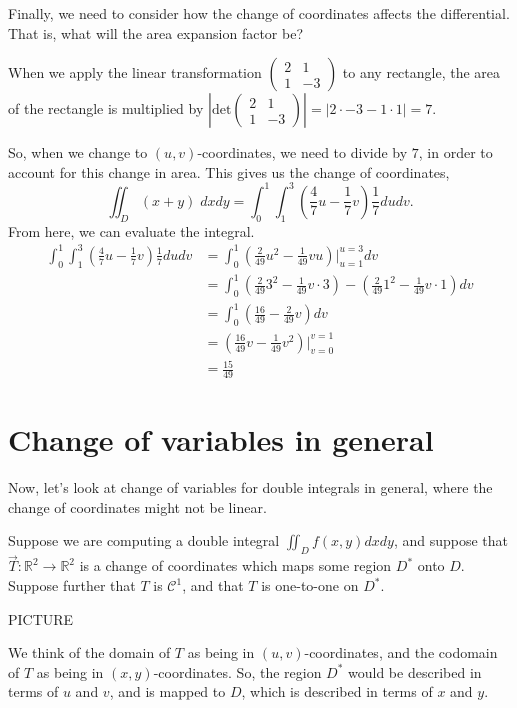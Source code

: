 \documentclass{ximera}
\begin{document}
Finally, we need to consider how the change of coordinates affects the differential. That is, what will the area expansion factor be?

When we apply the linear transformation $\begin{pmatrix}
2 & 1\\
1 & -3
\end{pmatrix}$ to any rectangle, the area of the rectangle is multiplied by $\left|\text{det}\begin{pmatrix}
2 & 1\\
1 & -3
\end{pmatrix}\right| = \left|2\cdot -3 - 1\cdot 1\right| = 7$.

So, when we change to $(u,v)$-coordinates, we need to divide by $7$, in order to account for this change in area. This gives us the change of coordinates,
\[
\iint_D (x+y)\;dxdy =\int_0^1\int_1^3 \left(\frac{4}{7}u - \frac{1}{7}v\right)\frac{1}{7}dudv.
\]
From here, we can evaluate the integral.
\begin{align*}
\int_0^1\int_1^3 \left(\frac{4}{7}u - \frac{1}{7}v\right)\frac{1}{7}dudv
&= \int_0^1 \left(\frac{2}{49}u^2 - \frac{1}{49}vu\right)|_{u=1}^{u=3}dv\\
&= \int_0^1 \left(\frac{2}{49}3^2 - \frac{1}{49}v\cdot 3\right) - \left(\frac{2}{49}1^2 - \frac{1}{49}v\cdot 1\right)dv\\
&= \int_0^1 \left(\frac{16}{49} - \frac{2}{49}v\right)dv\\
&= \left(\frac{16}{49}v - \frac{1}{49}v^2\right)|_{v=0}^{v=1}\\
&= \frac{15}{49}
\end{align*}

\section*{Change of variables in general}

Now, let's look at change of variables for double integrals in general, where the change of coordinates might not be linear.

Suppose we are computing a double integral $\iint_D f(x,y)dxdy$, and suppose that $\vec{T}:\mathbb{R}^2\rightarrow\mathbb{R}^2$ is a change of coordinates which maps some region $D^*$ onto $D$. Suppose further that $T$ is $\mathcal{C}^1$, and that $T$ is one-to-one on $D^*$.

PICTURE

We think of the domain of $T$ as being in $(u,v)$-coordinates, and the codomain of $T$ as being in $(x,y)$-coordinates. So, the region $D^*$ would be described in terms of $u$ and $v$, and is mapped to $D$, which is described in terms of $x$ and $y$.
\end{document}
